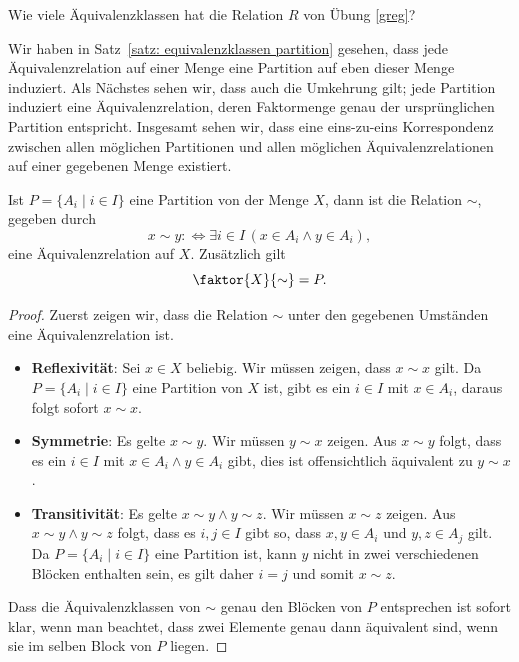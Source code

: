 \begin{ueb}
	Wie viele Äquivalenzklassen hat die Relation $R$ von Übung \ref{greg}?
\end{ueb}
\begin{lsg}
\end{lsg}

Wir haben in Satz~\ref{satz: equivalenzklassen partition} gesehen, dass jede 	Äquivalenzrelation auf einer Menge eine Partition auf eben dieser Menge induziert. Als Nächstes sehen wir, dass auch die Umkehrung gilt; jede Partition induziert eine Äquivalenzrelation, deren Faktormenge genau der ursprünglichen Partition entspricht. Insgesamt sehen wir, dass eine eins-zu-eins Korrespondenz zwischen allen möglichen Partitionen und allen möglichen Äquivalenzrelationen auf einer gegebenen Menge existiert.

\begin{satz}
Ist $P=\{A_i\mid i\in I\}$ eine Partition von der Menge $X$, dann ist die Relation $\sim$, gegeben durch
\[
x\sim y:\Leftrightarrow \exists i\in I\,(x\in A_i\land y\in A_i),
\]
eine Äquivalenzrelation auf $X$. Zusätzlich gilt
\[
\faktor{X}{\sim}=P.
\]
\end{satz}
\begin{proof}
Zuerst zeigen wir, dass die Relation $\sim$ unter den gegebenen Umständen eine Äquivalenzrelation ist.
\begin{itemize}
\item \textbf{Reflexivität}: Sei $x\in X$  beliebig. Wir müssen zeigen, dass $x\sim x$ gilt. Da $P=\{A_i\mid i\in I\}$ eine Partition von $X$ ist, gibt es ein $i\in I$ mit $x\in A_i$, daraus folgt sofort $x\sim x$.
\item \textbf{Symmetrie}: Es gelte $x\sim y$. Wir müssen $y\sim x$ zeigen. Aus $x\sim y$ folgt, dass es ein $i\in I$ mit $x\in A_i\land y\in A_i$ gibt, dies ist offensichtlich äquivalent zu $y\sim x$.
\item \textbf{Transitivität}: Es gelte $x\sim y\land y\sim z$. Wir müssen $x\sim z$ zeigen. Aus $x\sim y\land y\sim z$ folgt, dass es $i,j\in I$ gibt so, dass $x,y\in A_i$ und $y,z\in A_j$ gilt. Da $P=\{A_i\mid i\in I\}$ eine Partition ist, kann $y $ nicht in zwei verschiedenen Blöcken enthalten sein, es gilt daher $i=j$ und somit $x\sim z$.
\end{itemize}
Dass die Äquivalenzklassen von $\sim$ genau den Blöcken von $P$ entsprechen ist sofort klar, wenn man beachtet, dass zwei Elemente genau dann äquivalent sind, wenn sie im selben Block von $P$ liegen.
\end{proof}

